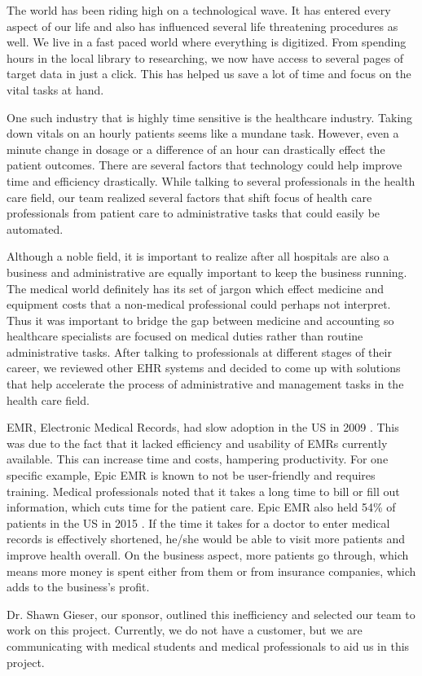 The world has been riding high on a technological wave. It has entered every aspect of our life and also has influenced several life threatening procedures as well. We live in a fast paced world where everything is digitized. From spending hours in the local library to researching, we now have access to several pages of target data in just a click.  This has helped us save a lot of time and focus on the vital tasks at hand. 

One such industry that is highly time sensitive is the healthcare industry. Taking down vitals on an hourly patients seems like a mundane task. However, even a minute change in dosage or a difference of an hour can drastically effect the patient outcomes. There are several factors that technology could help improve time and efficiency drastically. While talking to several professionals in the health care field, our team realized several factors that shift focus of health care professionals from patient care to administrative tasks that could easily be automated. 

Although a noble field, it is important to realize after all hospitals are also a business and administrative  are equally important to keep the business running. The medical world definitely has its set of jargon which effect medicine and equipment costs that a non-medical professional could perhaps not interpret. Thus it was important to bridge the gap between medicine and accounting so healthcare specialists are focused on medical duties rather than routine administrative tasks. After talking to professionals at different stages of their career, we reviewed other EHR systems and decided to come up with solutions that help accelerate the process of administrative and management tasks in the health care field. 

EMR, Electronic Medical Records, had slow adoption in the US in 2009 \cite{BeldenJ.L.GraysonR.AndBarnes2009}. This was due to the fact that it lacked efficiency and usability of EMRs currently available. This can increase time and costs, hampering productivity. For one specific example, Epic EMR is known to not be user-friendly and requires training. Medical professionals noted that it takes a long time to bill or fill out information, which cuts time for the patient care. Epic EMR also held 54\% of patients in the US in 2015 \cite{Glaze2015}. If the time it takes for a doctor to enter medical records is effectively shortened, he/she would be able to visit more patients and improve health overall. On the business aspect, more patients go through, which means more money is spent either from them or from insurance companies, which adds to the business's profit.

Dr. Shawn Gieser, our sponsor, outlined this inefficiency and selected our team to work on this project. Currently, we do not have a customer, but we are communicating with medical students and medical professionals to aid us in this project.